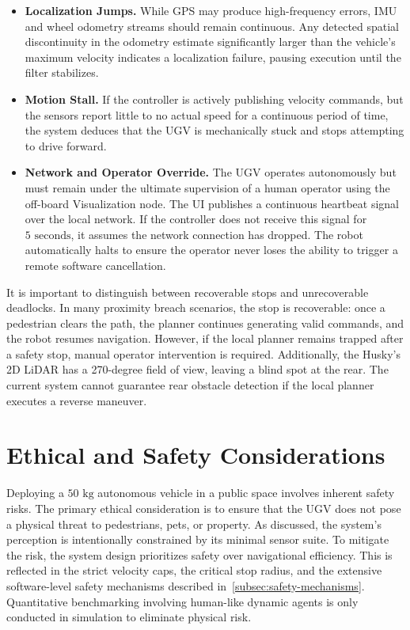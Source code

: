 \begin{itemize}
    \item \textbf{Localization Jumps.} While GPS may produce high-frequency errors, IMU and wheel odometry streams should remain continuous. Any detected spatial discontinuity in the odometry estimate significantly larger than the vehicle's maximum velocity indicates a localization failure, pausing execution until the filter stabilizes.
    \item \textbf{Motion Stall.} If the controller is actively publishing velocity commands, but the sensors report little to no actual speed for a continuous period of time, the system deduces that the UGV is mechanically stuck and stops attempting to drive forward.
    \item \textbf{Network and Operator Override.} The UGV operates autonomously but must remain under the ultimate supervision of a human operator using the off-board Visualization node. The UI publishes a continuous heartbeat signal over the local network. If the controller does not receive this signal for $5\text{ seconds}$, it assumes the network connection has dropped. The robot automatically halts to ensure the operator never loses the ability to trigger a remote software cancellation.
\end{itemize}

It is important to distinguish between recoverable stops and unrecoverable deadlocks. In many proximity breach scenarios, the stop is recoverable: once a pedestrian clears the path, the planner continues generating valid commands, and the robot resumes navigation. However, if the local planner remains trapped after a safety stop, manual operator intervention is required. Additionally, the Husky's 2D LiDAR has a 270-degree field of view, leaving a blind spot at the rear. The current system cannot guarantee rear obstacle detection if the local planner executes a reverse maneuver.

\section{Ethical and Safety Considerations}
\label{sec:ethical-considerations}

Deploying a $50\text{ kg}$ autonomous vehicle in a public space involves inherent safety risks. The primary ethical consideration is to ensure that the UGV does not pose a physical threat to pedestrians, pets, or property. As discussed, the system's perception is intentionally constrained by its minimal sensor suite. To mitigate the risk, the system design prioritizes safety over navigational efficiency. This is reflected in the strict velocity caps, the critical stop radius, and the extensive software-level safety mechanisms described in~\ref{subsec:safety-mechanisms}. Quantitative benchmarking involving human-like dynamic agents is only conducted in simulation to eliminate physical risk. 
 
